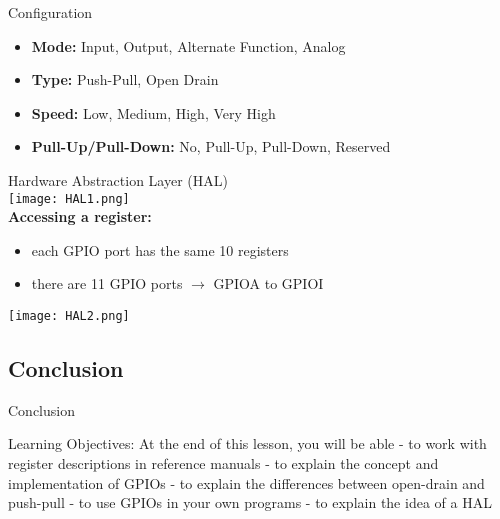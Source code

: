 \begin{definition}{Configuration}
    \begin{itemize}
        \item \textbf{Mode:} Input, Output, Alternate Function, Analog
        \item \textbf{Type:} Push-Pull, Open Drain
        \item \textbf{Speed:} Low, Medium, High, Very High
        \item \textbf{Pull-Up/Pull-Down:} No, Pull-Up, Pull-Down, Reserved
    \end{itemize}
\end{definition}

\begin{definition}{Hardware Abstraction Layer (HAL)}\\
    \texttt{[image: HAL1.png]}\\
    \textbf{Accessing a register:}
    \begin{itemize}
        \item each GPIO port has the same 10 registers 
        \item there are 11 GPIO ports $\rightarrow$ GPIOA to GPIOI
    \end{itemize}
    \texttt{[image: HAL2.png]}
\end{definition}

\subsection{Conclusion}

\begin{KR}{Conclusion}
\end{KR}

\begin{remark}
    Learning Objectives:
    At the end of this lesson, you will be able
    - to work with register descriptions in reference manuals
    - to explain the concept and implementation of GPIOs
    - to explain the differences between open-drain and push-pull
    - to use GPIOs in your own programs
    - to explain the idea of a HAL
\end{remark}


